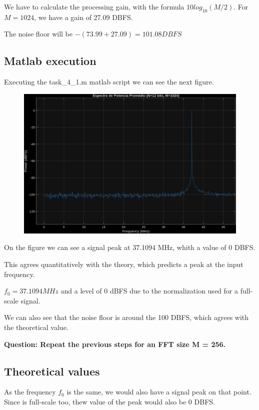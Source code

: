 We have to calculate the processing gain, with the formula $10log_{10}(M/2)$.
For $M=1024$, we have a gain of 27.09 DBFS.

The noise floor will be $-(73.99+27.09)=101.08 DBFS$

\subsection{Matlab execution}

Executing the task\_4\_1.m matlab script we can see the next figure.

\begin{figure}[H]
    \centering
    \includegraphics[width=1\textwidth]{img/task4_1.png}
    \label{fig:task4_1}
\end{figure}

On the figure we can see a signal peak at 37.1094 MHz, whith a value of 0 DBFS.

This agrees quantitatively with the theory, which predicts a peak at the input frequency.

$f_0 = 37.1094 MHz$ and a level of 0 dBFS due to the normalization used for a full-scale signal.

We can also see that the noise floor is around the 100 DBFS, which agrees with the theoretical value.
\vspace{1cm}

\textbf{Question: Repeat the previous steps for an FFT size M = 256.
}
\subsection{Theoretical values}
As the frequency $f_0$ is the same, we would also have a signal peak on that point.
Since is full-scale too, thew value of the peak would also be 0 DBFS.

